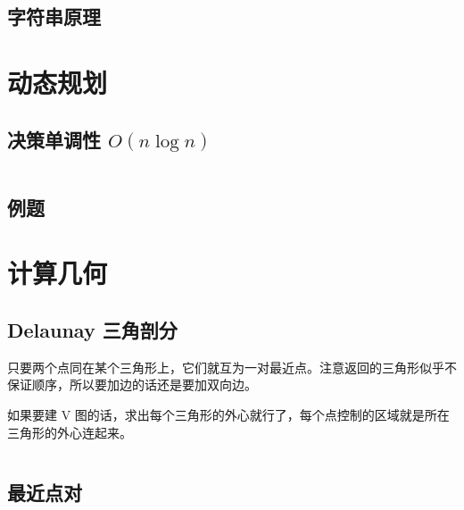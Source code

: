 \documentclass[a4paper, twoside]{article}
\begin{document}
\begin{multicols}{2}


			\subsection{字符串原理}
				

		\newpage
		\section{动态规划}
			\subsection{决策单调性 $O(n\log n)$}
				\inputminted{cpp}{../src/dp/决策单调性.cpp}
			
			\subsection{例题}
				

		\newpage
		\section{计算几何}
		 	\subsection{Delaunay 三角剖分}
				只要两个点同在某个三角形上，它们就互为一对最近点。注意返回的三角形似乎不保证顺序，所以要加边的话还是要加双向边。
				
				如果要建 V 图的话，求出每个三角形的外心就行了，每个点控制的区域就是所在三角形的外心连起来。
				\inputminted{cpp}{../src/geometry/delaunay.cpp}
		
	\end{multicols}
			
			\subsection{最近点对}
				

		\newpage
	
\end{document}
